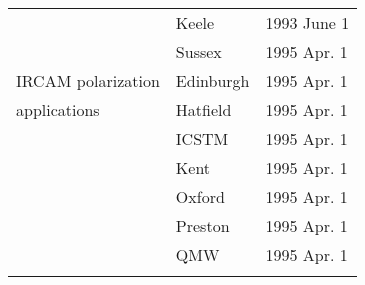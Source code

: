 \begin{table}
\begin{center}
\begin{tabular}{|p{36mm}|p{50mm}|p{30mm}|}
                        & Keele            & 1993 June 1 \\
                        & Sussex           & 1995 Apr. 1 \\
IRCAM polarization      & Edinburgh        & 1995 Apr. 1 \\
applications            & Hatfield         & 1995 Apr. 1 \\
                        & ICSTM            & 1995 Apr. 1 \\
                        & Kent             & 1995 Apr. 1 \\
                        & Oxford           & 1995 Apr. 1 \\
                        & Preston          & 1995 Apr. 1 \\
                        & QMW              & 1995 Apr. 1 \\
& & \\ \hline                   
\end{tabular}
\end{center}
\end{table}

